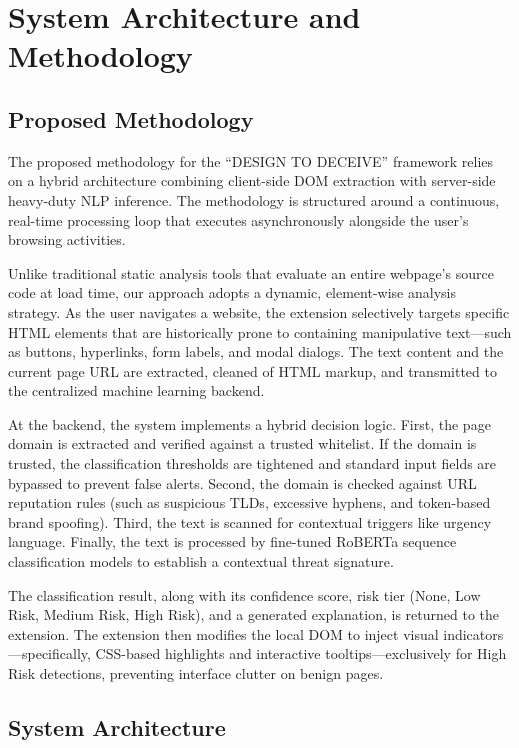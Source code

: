 \chapter{System Architecture and Methodology}

\section{Proposed Methodology}

The proposed methodology for the ``DESIGN TO DECEIVE'' framework relies on a hybrid architecture combining client-side DOM extraction with server-side heavy-duty NLP inference. The methodology is structured around a continuous, real-time processing loop that executes asynchronously alongside the user's browsing activities.

Unlike traditional static analysis tools that evaluate an entire webpage's source code at load time, our approach adopts a dynamic, element-wise analysis strategy. As the user navigates a website, the extension selectively targets specific HTML elements that are historically prone to containing manipulative text—such as buttons, hyperlinks, form labels, and modal dialogs. The text content and the current page URL are extracted, cleaned of HTML markup, and transmitted to the centralized machine learning backend.

At the backend, the system implements a hybrid decision logic. First, the page domain is extracted and verified against a trusted whitelist. If the domain is trusted, the classification thresholds are tightened and standard input fields are bypassed to prevent false alerts. Second, the domain is checked against URL reputation rules (such as suspicious TLDs, excessive hyphens, and token-based brand spoofing). Third, the text is scanned for contextual triggers like urgency language. Finally, the text is processed by fine-tuned RoBERTa sequence classification models to establish a contextual threat signature.

The classification result, along with its confidence score, risk tier (None, Low Risk, Medium Risk, High Risk), and a generated explanation, is returned to the extension. The extension then modifies the local DOM to inject visual indicators—specifically, CSS-based highlights and interactive tooltips—exclusively for High Risk detections, preventing interface clutter on benign pages.

\section{System Architecture}

